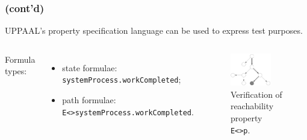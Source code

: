 \documentclass{beamer}
\newcommand{\recallframetitle}{}
\newcommand{\frametitlecont}{%
    \frametitle{\recallframetitle{} (cont'd)}%
}
\newcommand{\pauseafteritemize}{\pause[\thebeamerpauses]}
\newcommand{\monofont}[1]{{\footnotesize \texttt{#1}}}
\begin{document}
    \begin{frame}
        \frametitlecont{}
        \par UPPAAL's property specification language can be used to express test purposes.
        \pause
        \begin{columns}[t] %
                \par Formula types:
                \pause
                \begin{itemize}[<+->]
                    \item state formulae: \monofont{systemProcess.workCompleted};
                    \item path formulae: \monofont{E<>systemProcess.workCompleted}.
                \end{itemize}
                \begin{figure}
                    \includegraphics[width=0.75\textwidth]{images/presentation/ExamplePropertyVerificationSearch.png}
                    \caption{Verification of reachability property \texttt{E<>p}.}
                    \label{fig:verifyta_reachability}
                \end{figure}
        \end{columns}
    \end{frame}

\end{document}
